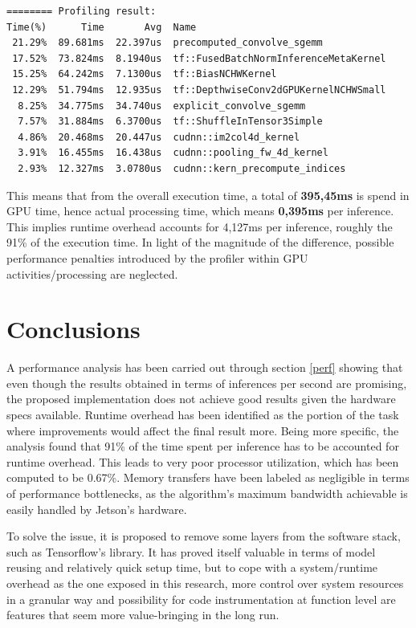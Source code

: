 \documentclass{article}
\begin{document}
\begin{lstlisting}
======== Profiling result:
Time(%)      Time       Avg  Name
 21.29%  89.681ms  22.397us  precomputed_convolve_sgemm
 17.52%  73.824ms  8.1940us  tf::FusedBatchNormInferenceMetaKernel
 15.25%  64.242ms  7.1300us  tf::BiasNCHWKernel
 12.29%  51.794ms  12.935us  tf::DepthwiseConv2dGPUKernelNCHWSmall
  8.25%  34.775ms  34.740us  explicit_convolve_sgemm
  7.57%  31.884ms  6.3700us  tf::ShuffleInTensor3Simple
  4.86%  20.468ms  20.447us  cudnn::im2col4d_kernel
  3.91%  16.455ms  16.438us  cudnn::pooling_fw_4d_kernel
  2.93%  12.327ms  3.0780us  cudnn::kern_precompute_indices
\end{lstlisting}\label{lst:prof}

This means that from the overall execution time, a total of \textbf{395,45ms} is spend in GPU time, hence actual processing time, which means \textbf{0,395ms} per inference. This implies runtime overhead accounts for 4,127ms per inference, roughly the 91\% of the execution time. In light of the magnitude of the difference, possible performance penalties introduced by the profiler within GPU activities/processing are neglected.

\section{Conclusions}\label{end}
A performance analysis has been carried out through section \ref{perf} showing that even though the results obtained in terms of inferences per second are promising, the proposed implementation does not achieve good results given the hardware specs available. Runtime overhead has been identified as the portion of the task where improvements would affect the final result more. Being more specific, the analysis found that 91\% of the time spent per inference has to be accounted for runtime overhead. This leads to very poor processor utilization, which has been computed to be 0.67\%. Memory transfers have been labeled as negligible in terms of performance bottlenecks, as the algorithm's maximum bandwidth achievable is easily handled by Jetson's hardware.

To solve the issue, it is proposed to remove some layers from the software stack, such as Tensorflow's library. It has proved itself valuable in terms of model reusing and relatively quick setup time, but to cope with a system/runtime overhead as the one exposed in this research, more control over system resources in a granular way and possibility for code instrumentation at function level are features that seem more value-bringing in the long run.
\end{document}
